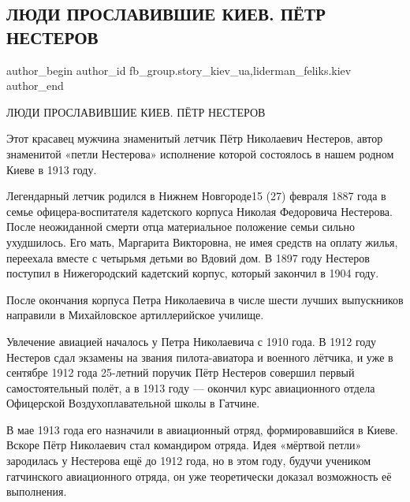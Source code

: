  
 
 
 
 
 
\subsection{ЛЮДИ ПРОСЛАВИВШИЕ КИЕВ. ПЁТР НЕСТЕРОВ}
\label{sec:09_12_2018.fb.fb_group.story_kiev_ua.1.petr_nesterov}
 
\ifcmt
 author_begin
   author_id fb_group.story_kiev_ua,liderman_feliks.kiev
 author_end
\fi

ЛЮДИ ПРОСЛАВИВШИЕ КИЕВ. ПЁТР НЕСТЕРОВ

Этот красавец мужчина знаменитый летчик Пётр Николаевич Нестеров, автор
знаменитой «петли Нестерова» исполнение которой состоялось в нашем родном Киеве
в 1913 году. 

Легендарный летчик родился в Нижнем Новгороде15 (27) февраля 1887 года в семье
офицера-воспитателя кадетского корпуса Николая Федоровича Нестерова. После
неожиданной смерти отца материальное положение семьи сильно ухудшилось. Его
мать, Маргарита Викторовна, не имея средств на оплату жилья,  переехала вместе
с четырьмя детьми во Вдовий дом. В 1897 году Нестеров поступил в Нижегородский
кадетский корпус, который закончил  в 1904 году. 


После окончания корпуса Петра Николаевича в числе шести лучших выпускников
направили в Михайловское артиллерийское училище. 

Увлечение авиацией началось у Петра Николаевича с 1910 года. В 1912 году
Нестеров сдал экзамены на звания пилота-авиатора и военного лётчика, и уже в
сентябре 1912 года 25-летний поручик Пётр Нестеров совершил первый
самостоятельный полёт, а в 1913 году — окончил курс авиационного отдела
Офицерской Воздухоплавательной школы в Гатчине. 

В мае 1913 года его назначили в авиационный отряд, формировавшийся в Киеве.
Вскоре Пётр Николаевич стал командиром отряда. Идея «мёртвой петли» зародилась
у Нестерова ещё до 1912 года, но в этом году, будучи учеником гатчинского
авиационного отряда, он уже теоретически доказал возможность её выполнения. 

